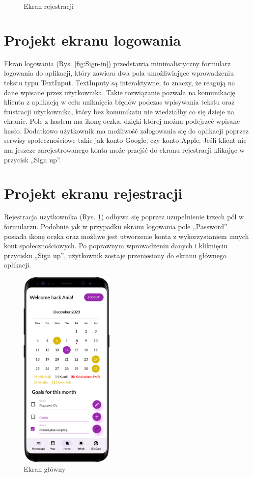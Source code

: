 \begin{figure}[t]
\begin{minipage}{0.4\textwidth}
		\caption{Ekran rejestracji}
		\label{fig:Sign-up}
	\end{minipage}
\end{figure}

\section{Projekt ekranu logowania}
Ekran logowania (Rys. \ref{fig:Sign-in}) przedstawia minimalistyczny formularz logowania do aplikacji, który zawiera dwa pola umożliwiające wprowadzeniu tekstu typu TextInput. TextInputy są interaktywne, to znaczy, że reagują na dane wpisane przez użytkownika. Takie rozwiązanie pozwala na komunikację klienta z aplikacją w celu uniknięcia błędów podczas wpisywania tekstu oraz frustracji użytkownika, który bez komunikatu nie wiedziałby co się dzieje na ekranie. Pole z hasłem ma ikonę oczka, dzięki której można podejrzeć wpisane hasło. Dodatkowo użytkownik ma możliwość zalogowania się do aplikacji poprzez serwisy społecznościowe takie jak konto Google, czy konto Apple. Jeśli klient nie ma jeszcze zarejestrowanego konta może przejść do ekranu rejestracji klikając w przycisk „Sign up”.

\section{Projekt ekranu rejestracji}
Rejestracja użytkownika (Rys. \ref{fig:Sign-up}) odbywa się poprzez uzupełnienie trzech pól w formularzu. Podobnie jak w przypadku ekranu logowania pole „Password” posiada ikonę oczka oraz możliwe jest utworzenie konta z wykorzystaniem innych kont społecznościowych. Po poprawnym wprowadzeniu danych i kliknięciu przycisku „Sign up”, użytkownik zostaje
przeniesiony do ekranu głównego aplikacji.

\begin{figure}[t]
	\begin{center}
		\begin{minipage}{0.4\textwidth}
			\centering
			\includegraphics[height=10cm, keepaspectratio]{images/interfejs_figma/Home}
			\caption{Ekran główny}
			\label{fig:Home}
		\end{minipage}
	\end{center}
\end{figure}

